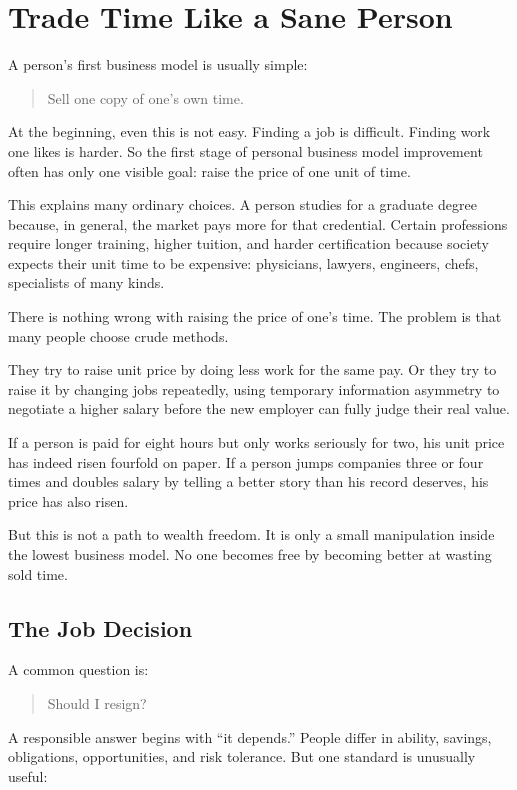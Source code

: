 \chapter{Trade Time Like a Sane Person}

A person's first business model is usually simple:

\begin{quote}
Sell one copy of one's own time.
\end{quote}

At the beginning, even this is not easy. Finding a job is difficult. Finding work one likes is harder. So the first stage of personal business model improvement often has only one visible goal: raise the price of one unit of time.

This explains many ordinary choices. A person studies for a graduate degree because, in general, the market pays more for that credential. Certain professions require longer training, higher tuition, and harder certification because society expects their unit time to be expensive: physicians, lawyers, engineers, chefs, specialists of many kinds.

There is nothing wrong with raising the price of one's time. The problem is that many people choose crude methods.

They try to raise unit price by doing less work for the same pay. Or they try to raise it by changing jobs repeatedly, using temporary information asymmetry to negotiate a higher salary before the new employer can fully judge their real value.

If a person is paid for eight hours but only works seriously for two, his unit price has indeed risen fourfold on paper. If a person jumps companies three or four times and doubles salary by telling a better story than his record deserves, his price has also risen.

But this is not a path to wealth freedom. It is only a small manipulation inside the lowest business model. No one becomes free by becoming better at wasting sold time.

\section*{The Job Decision}

A common question is:

\begin{quote}
Should I resign?
\end{quote}

A responsible answer begins with ``it depends.'' People differ in ability, savings, obligations, opportunities, and risk tolerance. But one standard is unusually useful:

